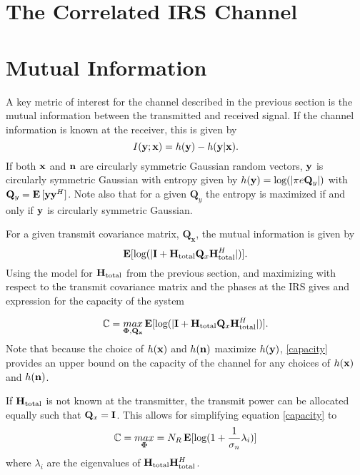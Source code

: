 \documentclass[12pt,a4paper]{report}
\begin{document}
\section{The Correlated IRS Channel}


\section{Mutual Information}
A key metric of interest for the channel described in the previous section is the mutual information between the transmitted and received signal. If the channel information is known at the receiver, this is given by 
\begin{equation}
I(\mathbf{y};\mathbf{x}) = h(\mathbf{y}) - h(\mathbf{y}|\mathbf{x}).
\end{equation}
If both $\mathbf{x}$ and $\mathbf{n}$ are circularly symmetric Gaussian random vectors, $\mathbf{y}$ is circularly symmetric Gaussian with entropy given by \cite{telatar1999capacity} $h(\mathbf{y}) = \text{log{}}(|\pi e \mathbf{Q}_{y}|)$ with $\mathbf{Q}_{y} = \mathop{\bf E{}}{[\mathbf{y} \mathbf{y}^H]}$. Note also that for a given $\mathbf{Q}_{y}$ the entropy is maximized if and only if $\mathbf{y}$ is circularly symmetric Gaussian.

For a given transmit covariance matrix, $\mathbf{Q_x}$, the mutual information is given by 
\begin{equation}\label{mut_inf}
\mathop{\bf E{}} [\text{log{}}(|\mathbf{I} + \mathbf{H}_\text{total} \mathbf{Q}_x \mathbf{H}_\text{total}^H|)].
\end{equation}
Using the model for $\mathbf{H}_\text{total}$ from the previous section, and maximizing with respect to the
transmit covariance matrix and the phases at the IRS gives and expression for the capacity of the system

\begin{equation}\label{capacity}
\mathbb{C} = \underset{\boldsymbol{\Phi},\mathbf{Q_x}}{\mathop{max}} \mathop{\bf E{}} [\text{log{}}(|\mathbf{I} + \mathbf{H}_\text{total} \mathbf{Q}_x \mathbf{H}_\text{total}^H|)].
\end{equation}
Note that because the choice of $h(\mathbf{x}) $ and $h(\mathbf{n})$ maximize $h(\mathbf{y})$, \eqref{capacity} provides an upper bound on the capacity of the channel for any choices of $h(\mathbf{x}) $ and $h(\mathbf{n})$.

If $\mathbf{H}_\text{total}$ is not known at the transmitter, the transmit power can be allocated
equally such that $\mathbf{Q}_x = \mathbf{I}$. This allows for simplifying equation \eqref{capacity} to 
\begin{equation}\label{no_csi_capacity}
\mathbb{C} = \underset{\boldsymbol{\Phi}}{\mathop{max}} = N_R \mathop{\bf E{}}[\text{log{}}(1 + \frac{1}{\sigma_n}\lambda_i)]
\end{equation}
where $\lambda_i$ are the eigenvalues of $\mathbf{H}_\text{total} \mathbf{H}_\text{total}^H$.
\end{document}

